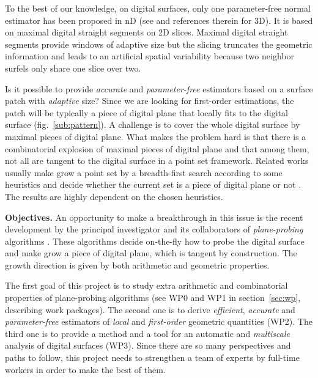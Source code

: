 To the best of our knowledge, on digital surfaces, only one parameter-free normal estimator has been proposed in nD (see \cite{Lachaud2003} and references therein for 3D). It is based on maximal digital straight segments on 2D slices. Maximal digital straight segments provide windows of adaptive size but the slicing truncates the geometric information and leads to an artificial spatial variability because two neighbor surfels only share one slice over two.     

Is it possible to provide \emph{accurate} and \emph{parameter-free} estimators based on a surface patch with \emph{adaptive} size?
Since we are looking for first-order estimations, the patch will be typically a piece of digital plane that locally fits to the digital surface (fig.~\ref{sub:pattern}). A challenge is to cover the whole digital surface by maximal pieces of digital plane. 
What makes the problem hard is that there is a combinatorial explosion of maximal pieces of digital plane \cite{Sivignon2009} and that among them, not all are tangent to the digital surface in a point set framework.  
Related works usually make grow a point set by a breadth-first search according to some heuristics and decide whether the current set is a piece of digital plane or not \cite{Sivignon2004,Charrier2011}. The results are highly dependent on the chosen heuristics.   

\noindent\textbf{Objectives.}
An opportunity to make a breakthrough in this issue is the recent development by the principal investigator and its collaborators of \emph{plane-probing} algorithms \cite{LPRTCS2016, LPRDGCI2016, LPRJMIV2017}. These algorithms decide on-the-fly how to probe the digital surface and make grow a piece of digital plane, which is tangent by construction. The growth direction is given by both arithmetic and geometric properties.

The first goal of this project is to study extra arithmetic and combinatorial properties of plane-probing algorithms (see WP0 and WP1 in section~\ref{sec:wp}, describing work packages). The second one is to derive \emph{efficient}, \emph{accurate} and \emph{parameter-free} estimators of \emph{local} and \emph{first-order} geometric quantities (WP2). The third one is to provide a method and a tool for an automatic and \emph{multiscale} analysis of digital surfaces (WP3). 
Since there are so many perspectives and paths to follow, this project needs to strengthen a team of experts by full-time workers in order to make the best of them. 
